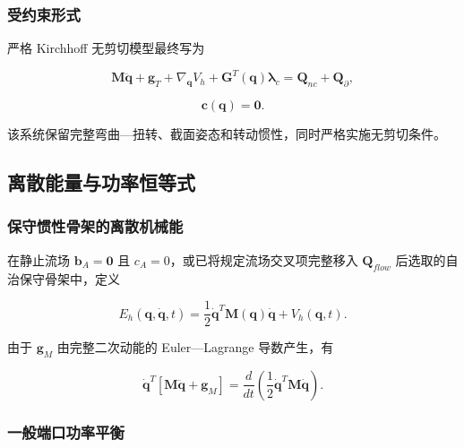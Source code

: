 \subsubsection{受约束形式}\label{sec:galerkin-2-8-2}

严格 Kirchhoff 无剪切模型最终写为

\begin{equation}
\label{eq:galerkin-2-99}
\mathbf{M}\ddot{\mathbf{q}} + \mathbf{g}_{T} + \nabla_{\mathbf{q}}V_{h} + \mathbf{G}^{T}\left( \mathbf{q} \right)\bm{\lambda}_{c} = \mathbf{Q}_{nc} + \mathbf{Q}_{\partial},
\end{equation}

\begin{equation}
\label{eq:galerkin-2-100}
\mathbf{c}\left( \mathbf{q} \right) = \mathbf{0}.
\end{equation}

该系统保留完整弯曲---扭转、截面姿态和转动惯性，同时严格实施无剪切条件。

\subsection{离散能量与功率恒等式}\label{sec:galerkin-2-9}

\subsubsection{保守惯性骨架的离散机械能}\label{sec:galerkin-2-9-1}

在静止流场 \(\mathbf{b}_{A} = \mathbf{0}\) 且 \(c_{A} = 0\)，或已将规定流场交叉项完整移入 \(\mathbf{Q}_{flow}\) 后选取的自治保守骨架中，定义

\begin{equation}
\label{eq:galerkin-2-101}
E_{h}\left( \mathbf{q},\dot{\mathbf{q}},t \right) = \frac{1}{2}{\dot{\mathbf{q}}}^{T}\mathbf{M}\left( \mathbf{q} \right)\dot{\mathbf{q}} + V_{h}\left( \mathbf{q},t \right).
\end{equation}

由于 \(\mathbf{g}_{M}\) 由完整二次动能的 Euler---Lagrange 导数产生，有

\begin{equation}
\label{eq:galerkin-2-102}
{\dot{\mathbf{q}}}^{T}\left\lbrack \mathbf{M}\ddot{\mathbf{q}} + \mathbf{g}_{M} \right\rbrack = \frac{d}{dt}\left( \frac{1}{2}{\dot{\mathbf{q}}}^{T}\mathbf{M}\dot{\mathbf{q}} \right).
\end{equation}

\subsubsection{一般端口功率平衡}\label{sec:galerkin-2-9-2}


